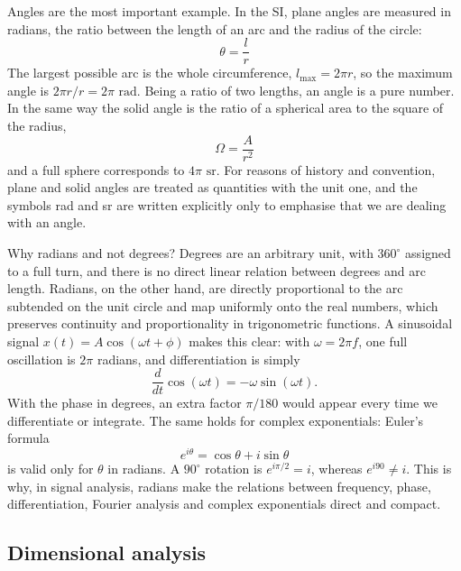 \documentclass[letterpaper,11pt,leqno]{book}
\begin{document}
Angles are the most important example. In the SI, plane angles are measured in radians, the ratio between the length of an arc and the radius of the circle:
\begin{equation}
\boxed{\theta = \frac{l}{r}}
\label{eq:plane_angle_def}
\end{equation}
The largest possible arc is the whole circumference, $l_{\max} = 2\pi r$, so the maximum angle is $2\pi r / r = 2\pi\text{ rad}$. Being a ratio of two lengths, an angle is a pure number. In the same way the solid angle is the ratio of a spherical area to the square of the radius,
\begin{equation}
\boxed{\Omega = \frac{A}{r^2}}
\label{eq:solid_angle_def}
\end{equation}
and a full sphere corresponds to $4\pi\text{ sr}$. For reasons of history and convention, plane and solid angles are treated as quantities with the unit one, and the symbols rad and sr are written explicitly only to emphasise that we are dealing with an angle.

Why radians and not degrees? Degrees are an arbitrary unit, with $360^\circ$ assigned to a full turn, and there is no direct linear relation between degrees and arc length. Radians, on the other hand, are directly proportional to the arc subtended on the unit circle and map uniformly onto the real numbers, which preserves continuity and proportionality in trigonometric functions. A sinusoidal signal $x(t) = A\cos(\omega t + \phi)$ makes this clear: with $\omega = 2\pi f$, one full oscillation is $2\pi$ radians, and differentiation is simply
\begin{equation}
\frac{d}{dt}\cos(\omega t) = -\omega\sin(\omega t).
\label{eq:trig_derivative}
\end{equation}
With the phase in degrees, an extra factor $\pi/180$ would appear every time we differentiate or integrate. The same holds for complex exponentials: Euler's formula
\begin{equation}
e^{i\theta} = \cos\theta + i\sin\theta
\label{eq:euler_identity}
\end{equation}
is valid only for $\theta$ in radians. A $90^\circ$ rotation is $e^{i\pi/2} = i$, whereas $e^{i90} \neq i$. This is why, in signal analysis, radians make the relations between frequency, phase, differentiation, Fourier analysis and complex exponentials direct and compact.

\subsection{Dimensional analysis}
\label{sec:dimensional_analysis}
\end{document}
